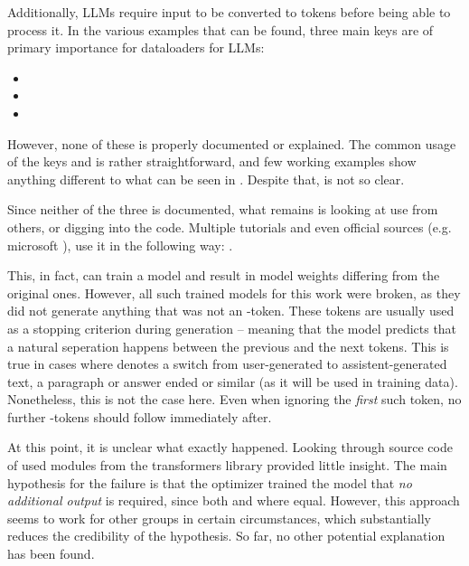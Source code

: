 Additionally, \glspl{LLM} require input to be converted to tokens before being able to process it.
In the various examples that can be found, three main keys are of primary importance for dataloaders for \glspl{LLM}:

\begin{itemize}
    \item {}
    \item {}
    \item {}
\end{itemize}


However, none of these is properly documented or explained.
The common usage of the keys  and  is rather straightforward, and few working examples show anything different to what can be seen in .
Despite that,  is not so clear.

Since neither of the three is documented, what remains is looking at use from others, or digging into the code.
Multiple tutorials and even official sources (e.g. microsoft \cite{deepspeedexamples_2023}), use it in the following way: .

This, in fact, can train a model and result in model weights differing from the original ones.
However, all such trained models for this work were broken, as they did not generate anything that was not an -token.
These tokens are usually used as a stopping criterion during generation -- meaning that the model predicts that a natural seperation happens between the previous and the next tokens. 
This is true in cases where  denotes a switch from user-generated to assistent-generated text, a paragraph or answer ended or similar (as it will be used in training data).
Nonetheless, this is not the case here. Even when ignoring the \textit{first} such token, no further -tokens should follow immediately after.

At this point, it is unclear what exactly happened.
Looking through source code of used modules from the \gls{transformers} library provided little insight.
The main hypothesis for the failure is that the optimizer trained the model that \textit{no additional output} is required, since both  and  where equal.
However, this approach seems to work for other groups in certain circumstances, which substantially reduces the credibility of the hypothesis.
So far, no other potential explanation has been found.

